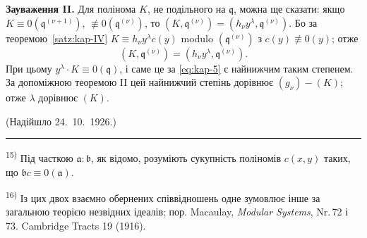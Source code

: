 \documentclass[11pt]{article}
\newcommand{\foreign}[1]{#1}
\theoremstyle{plain}
\begin{document}
\textbf{Зауваження II.} Для полінома $K$, не подільного на
$\mathfrak{q}$, можна ще сказати: якщо
$K \equiv 0(\mathfrak{q}^{(\nu+1)})$,
$\not\equiv 0(\mathfrak{q}^{(\nu)})$, то
$(K, \mathfrak{q}^{(\nu)}) = (h_{\nu}y^{\lambda}, \mathfrak{q}^{(\nu)})$.
Бо за теоремою~\ref{satz:kap-IV}
$K \equiv h_{\nu}y^{\lambda}c(y)$ modulo
$(\mathfrak{q}^{(\nu)})$ з $c(y) \not\equiv 0(y)$; отже
\[
(K, \mathfrak{q}^{(\nu)}) = (h_{\nu}y^{\lambda}, \mathfrak{q}^{(\nu)}).
\]
При цьому $y^{\lambda} \cdot K \equiv 0(\mathfrak{q})$, і саме це
за \eqref{eq:kap-5} є найнижчим таким степенем. За допоміжною
теоремою II цей найнижчий степінь дорівнює $(g_{\nu}) - (K)$; отже
$\lambda$ дорівнює $(K)$.

\vfill
\begin{flushright}
(Надійшло 24.\ 10.\ 1926.)
\end{flushright}

\vspace{0.5em}
\noindent\rule{\textwidth}{0.4pt}
\vspace{0.3em}

{\footnotesize
\textsuperscript{15)} Під часткою $\mathfrak{a}:\mathfrak{b}$, як відомо,
розуміють сукупність поліномів $c(x,y)$ таких, що
$\mathfrak{b}c \equiv 0(\mathfrak{a})$.

\textsuperscript{16)} Із цих двох взаємно обернених співвідношень одне
зумовлює інше за загальною теорією незвідних ідеалів; пор.
Macaulay, \textit{Modular Systems}, Nr.\,72 і 73.
\foreign{Cambridge Tracts} 19 (1916).
}
\end{document}
